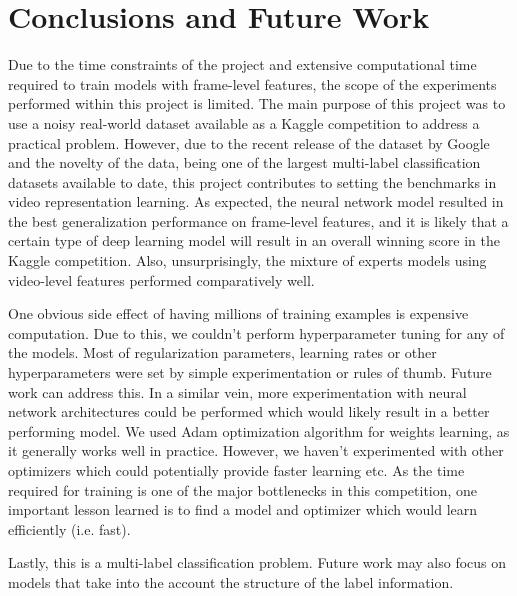 \documentclass{sig-alternate-05-2015}
\begin{document}
\section{Conclusions and Future Work}
Due to the time constraints of the project and extensive computational time required to train models with frame-level features, the scope of the experiments performed within this project is limited. The main purpose of this project was to use a noisy real-world dataset available as a Kaggle competition to address a practical problem. However, due to the recent release of the dataset by Google and the novelty of the data, being one of the largest multi-label classification datasets available to date, this project contributes to setting the benchmarks in video representation learning. As expected, the neural network model resulted in the best generalization performance on frame-level features, and it is likely that a certain type of deep learning model will result in an overall winning score in the Kaggle competition. Also, unsurprisingly, the mixture of experts models using video-level features performed comparatively well. 

One obvious side effect of having millions of training examples is expensive computation. Due to this, we couldn't perform hyperparameter tuning for any of the models. Most of regularization parameters, learning rates or other hyperparameters were set by simple experimentation or rules of thumb. Future work can address this. In a similar vein, more experimentation with neural network architectures could be performed which would likely result in a better performing model. We used Adam optimization algorithm for weights learning, as it generally works well in practice. However, we haven't experimented with other optimizers which could potentially provide faster learning etc. As the time required for training is one of the major bottlenecks in this competition, one important lesson learned is to find a model and optimizer which would learn efficiently (i.e. fast). 

Lastly, this is a multi-label classification problem. Future work may also focus on models that take into the account the structure of the label information. 






%

% 
\end{document}
